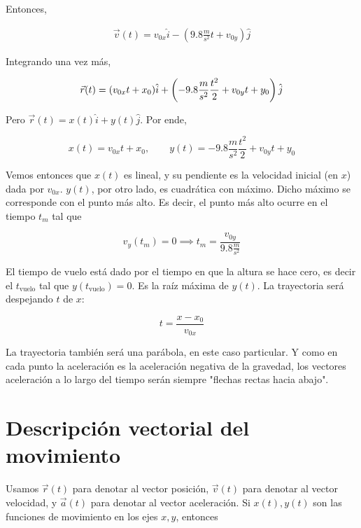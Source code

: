 \documentclass[12pt]{article}
\theoremstyle{definition}
\begin{document}
Entonces, 

\begin{align*}
    \vec{v}(t) = v_{0x} \hat{i} - ( 9.8 \frac{m}{s^2}t + v_{0y} ) \hat{j}
\end{align*}

Integrando una vez más, 

\begin{equation*}
    \vec{r}(t) 
    = ( v_{0x}t + x_0 ) \hat{i} + \left( - 9.8 \frac{m}{s^2}
    \frac{t^2}{2} + v_{0y}t + y_0 \right)  \hat{j}\\ 
\end{equation*}

Pero $\vec{r}(t) = x(t) \hat{i} + y(t) \hat{j}$. Por ende, 

\begin{equation*}
    x(t) = v_{0x} t + x_0, \qquad y(t) = - 9.8 \frac{m}{s^2} \frac{t^2}{2} +
    v_{0y}t + y_0
\end{equation*}

Vemos entonces que $x(t)$ es lineal, y su pendiente es la velocidad inicial (en
$x$) dada por $v_{0x}$. $y(t)$, por otro lado, es cuadrática con máximo. Dicho
máximo se corresponde con el punto más alto. Es decir, el punto más alto ocurre
en el tiempo $t_m$ tal que

\begin{equation*}
    v_y(t_m) = 0 \implies t_m = \frac{v_{0y}}{9.8 \frac{m}{s^2}}
\end{equation*}

El tiempo de vuelo está dado por el tiempo en que la altura se hace cero, es
decir el $t_{\text{vuelo}}$ tal que $y(t_{\text{vuelo}}) = 0$. Es la raíz máxima
de
$y(t)$. La trayectoria será despejando $t$ de $x$: 

\begin{equation*}
    t = \frac{x - x_0}{v_{0x}}
\end{equation*}

La trayectoria también será una parábola, en este caso particular. Y como en
cada punto la aceleración es la aceleración negativa de la gravedad, los
vectores aceleración a lo largo del tiempo serán siempre "flechas rectas hacia
abajo".

\pagebreak
\section{Descripción vectorial del movimiento}

Usamos $\vec{r}(t)$ para denotar al vector posición, $\vec{v}(t)$ para denotar
al vector velocidad, y $\vec{a}(t)$ para denotar al vector aceleración. Si
$x(t), y(t)$ son las funciones de movimiento en los ejes $x, y$, entonces 
\end{document}
